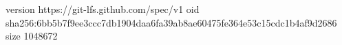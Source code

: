 version https://git-lfs.github.com/spec/v1
oid sha256:6bb5b7f9ee3ccc7db1904daa6fa39ab8ae60475fe364e53c15cdc1b4af9d2686
size 1048672
